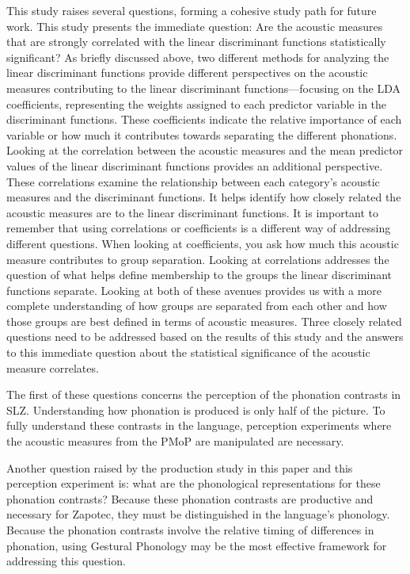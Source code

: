 \documentclass[12pt, letterpaper]{article}
\begin{document}
This study raises several questions, forming a cohesive study path for future work. This study presents the immediate question: Are the acoustic measures that are strongly correlated with the linear discriminant functions statistically significant? As briefly discussed above, two different methods for analyzing the linear discriminant functions provide different perspectives on the acoustic measures contributing to the linear discriminant functions—focusing on the LDA coefficients, representing the weights assigned to each predictor variable in the discriminant functions. These coefficients indicate the relative importance of each variable or how much it contributes towards separating the different phonations. Looking at the correlation between the acoustic measures and the mean predictor values of the linear discriminant functions provides an additional perspective. These correlations examine the relationship between each category's acoustic measures and the discriminant functions. It helps identify how closely related the acoustic measures are to the linear discriminant functions. It is important to remember that using correlations or coefficients  is a different way of addressing different questions. When looking at coefficients, you ask how much this acoustic measure contributes to group separation. Looking at correlations addresses the question of what helps define membership to the groups the linear discriminant functions separate. Looking at both of these avenues provides us with a more complete understanding of how groups are separated from each other and how those groups are best defined in terms of acoustic measures. Three closely related questions need to be addressed based on the results of this study and the answers to this immediate question about the statistical significance of the acoustic measure correlates.

The first of these questions concerns the perception of the phonation contrasts in SLZ. Understanding how phonation is produced is only half of the picture. To fully understand these contrasts in the language, perception experiments where the acoustic measures from the PMoP are manipulated are necessary.

Another question raised by the production study in this paper and this perception experiment is: what are the phonological representations for these phonation contrasts? Because these phonation contrasts are productive and necessary for Zapotec, they must be distinguished in the language's phonology. Because the phonation contrasts involve the relative timing of differences in phonation, using Gestural Phonology \citep{browmanArticulatoryGesturesPhonological1989,browmanArticulatoryPhonologyOverview1992} may be the most effective framework for addressing this question. 
\end{document}
